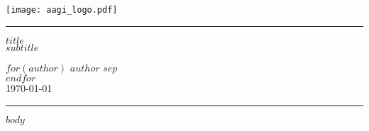 \documentclass{scrartcl}
\begin{document}
	\begin{titlepage}

		\thispagestyle{Title_page}

		\vspace*{-2cm}

		\begin{center}
			\texttt{[image: aagi\_logo.pdf]}
		\end{center}

		\vfill

		\rule{\textwidth}{0.5pt}

		\begin{FlushRight}

			\huge
			\textcolor{aagiteal}{\textbf{$title$}}\\[6mm]

			\large
			{\textbf{$subtitle$}}\\[5mm]
			\vspace{2mm}

			\normalsize
			$for(author)$
			$author$
			$sep$ \\[8mm]
			$endfor$\\[8mm]

    		\today
  \end{FlushRight}

  \rule{\textwidth}{0.5pt}

  \vfill

	\end{titlepage}

	\newpage

	$body$
\end{document}
